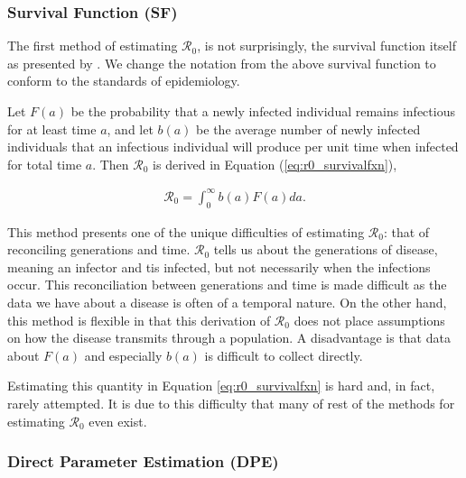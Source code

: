 \documentclass[12pt]{article}
\newcommand{\rr}{\ensuremath{\mathcal{R}_0}}
\begin{document}
\subsubsection{Survival Function (SF)}
\label{sec:survival_fxn}
The first method of estimating $\rr$, is not surprisingly, the survival function itself as presented by \cite{Heffernan2005}.  We change the notation from the above survival function to conform to the standards of epidemiology.  

Let $F(a)$ be the probability that a newly infected individual remains infectious for at least time $a$, and let $b(a)$ be the average number of newly infected individuals that an infectious individual will produce per unit time when infected for total time $a$.  Then $\rr$ is derived in Equation (\ref{eq:r0_survivalfxn}),

\begin{align}\label{eq:r0_survivalfxn}
  \rr = \int_0^\infty b(a)F(a)da.
\end{align}

This method presents one of the unique difficulties of estimating $\rr$: that of reconciling generations and time.  $\rr$ tells us about the generations of disease, meaning an infector and tis infected, but not necessarily when the infections occur.  This reconciliation between generations and time is made difficult as the data we have about a disease is often of a temporal nature.  On the other hand, this method is flexible in that this derivation of $\rr$  does not place assumptions on how the disease transmits through a population.  A disadvantage is that data about $F(a)$ and especially $b(a)$ is difficult to collect directly.

Estimating this quantity in Equation \ref{eq:r0_survivalfxn} is hard and, in fact, rarely attempted. It is due to this difficulty that many of rest of the methods for estimating $\rr$ even exist.  



\subsubsection{Direct Parameter Estimation (DPE)}
\label{sec:dpe}
\end{document}
